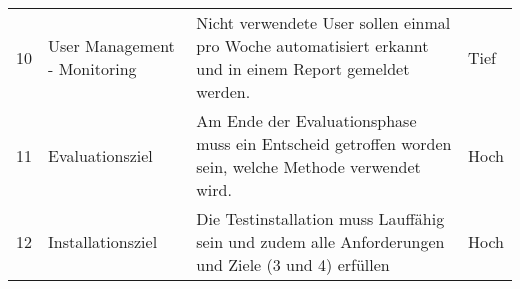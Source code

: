 \begin{flushleft}
\begin{table}[H]
{\begin{tabular}{@{}llll@{}}
10           & User Management - Monitoring                      & Nicht verwendete User sollen einmal pro Woche automatisiert erkannt und in einem Report gemeldet werden.                                                                                                                                                                                                                                                                                                                                                                                                                                                                                                                                                                                                                                                                                                                                                                             & Tief               \\
11           & Evaluationsziel                                   & Am Ende der Evaluationsphase muss ein Entscheid getroffen worden sein, welche Methode verwendet wird.                                                                                                                                                                                                                                                                                                                                                                                                                                                                                                                                                                                                                                                                                                                                                                                & Hoch               \\
12           & Installationsziel                                 & Die Testinstallation muss Lauffähig sein und zudem alle Anforderungen und Ziele (3 und 4) erfüllen                                                                                                                                                                                                                                                                                                                                                                                                                                                                                                                                                                                                                                                                                                                                                                                   & Hoch               \\

\end{tabular}}
\end{table}
\end{flushleft}
